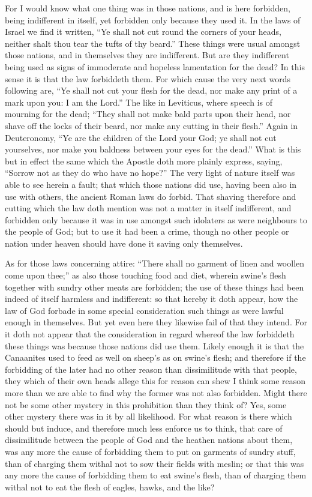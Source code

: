 For I would know what one thing was in those nations, and is here forbidden, being indifferent in itself, yet forbidden only because they used it. In the laws of Israel we find it written, “Ye shall not cut round the corners of your heads, neither shalt thou tear the tufts of thy beard.” These  things were usual amongst those nations, and in themselves they are indifferent. But are they indifferent being used as signs of immoderate and hopeless lamentation for the dead? In this sense it is that the law forbiddeth them. For which cause the very next words following are, “Ye shall not cut your flesh for the dead, nor make any print of a mark upon you: I am the Lord.” The like in Leviticus, where speech is of mourning for the dead; “They shall not make bald parts upon their head, nor shave off the locks of their beard, nor make any cutting in their flesh.” Again in Deuteronomy, “Ye are the children of the Lord your God; ye shall not cut yourselves, nor make you baldness between your eyes for the dead.” What is this but in effect the same which the Apostle doth more plainly express, saying, “Sorrow not as they do who have no hope?” The very light of nature itself was able to see herein a fault; that which those nations did use, having been also in use with others, the ancient Roman laws do forbid. That shaving therefore and cutting which the law doth mention was not a matter in itself indifferent, and forbidden only because it was in use amongst such idolaters as were neighbours to the people of God; but to use it had been a crime, though no other people or nation under heaven should have done it saving only themselves.

As for those laws concerning attire: “There shall no garment of linen and woollen come upon thee;” as also those touching food and diet, wherein swine’s flesh together with sundry other meats are forbidden; the use of these things had been indeed of itself harmless and indifferent: so that hereby it doth appear, how the law of God forbade in some special consideration such things as were lawful enough in themselves. But yet even here they likewise fail of that they intend. For it doth not appear that the consideration in regard whereof the law forbiddeth these things was because those nations did use them. Likely enough it is that the  Canaanites used to feed as well on sheep’s as on swine’s flesh; and therefore if the forbidding of the later had no other reason than dissimilitude with that people, they which of their own heads allege this for reason can shew I think some reason more than we are able to find why the former was not also forbidden. Might there not be some other mystery in this prohibition than they think of? Yes, some other mystery there was in it by all likelihood. For what reason is there which should but induce, and therefore much less enforce us to think, that care of dissimilitude between the people of God and the heathen nations about them, was any more the cause of forbidding them to put on garments of sundry stuff, than of charging them withal not to sow their fields with meslin; or that this was any more the cause of forbidding them to eat swine’s flesh, than of charging them withal not to eat the flesh of eagles, hawks, and the like?

